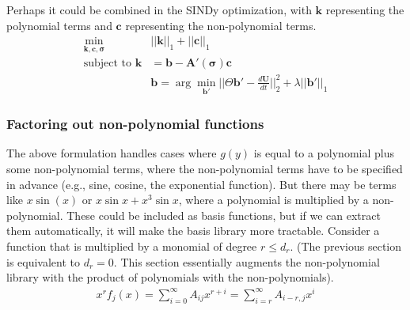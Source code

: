 \documentclass{article}
\let\vec\mathbf
\begin{document}
Perhaps it could be combined in the SINDy optimization, with $\vec{k}$
representing the polynomial terms and $\vec{c}$ representing the non-polynomial
terms.
\begin{align*}
\min_{\vec{k},\vec{c},\vec{\sigma}} & ||\vec{k}||_1 + ||\vec{c}||_1
\\\text{subject to } \vec{k} &=  \vec{b} - \vec{A}'(\vec{\sigma})\vec{c}
\\ & \vec{b} = \arg \min_{\vec{b}'} ||\Theta \vec{b}' - \tfrac{d\vec{U}}{dt}||_2^2 + \lambda ||\vec{b}'||_1
\end{align*}


\subsubsection{Factoring out non-polynomial functions}

The above formulation handles cases where $g(y)$ is equal to a polynomial plus
some non-polynomial terms, where the non-polynomial terms have to be specified
in advance (e.g., sine, cosine, the exponential function). But there may be
terms like $x \sin(x)$ or $x\sin x + x^3\sin x$, where a polynomial is
multiplied by a non-polynomial. These could be included as basis functions, but
if we can extract them automatically, it will make the basis library more
tractable. Consider a function that is multiplied by a monomial of degree $r \le
d_r$. (The previous section is equivalent to $d_r=0$. This section essentially
augments the non-polynomial library with the product of polynomials with the
non-polynomials).
\begin{align*}
x^r f_j(x) = \sum_{i=0}^\infty A_{ij} x^{r+i} = \sum_{i=r}^\infty A_{i-r,j} x^{i}
\end{align*}
\end{document}
